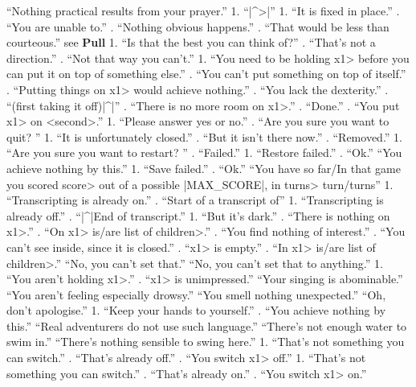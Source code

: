 {{{   ``Nothing practical results from your prayer.''
 1. ``|^>|''
  1. ``It is fixed in place.''
. ``You are unable to.''
. ``Nothing obvious happens.''
. ``That would be less than courteous.''
 see {\bf Pull}
 1. ``Is that the best you can think of?''
. ``That's not a direction.''
. ``Not that way you can't.''
  1. ``You need to be holding \<x1> before you
can put it on top of something else.''
. ``You can't put something on top of itself.''
. ``Putting things on \<x1> would achieve nothing.''
. ``You lack the dexterity.''
. ``(first taking it off)|^|''
. ``There is no more room on \<x1>.''
. ``Done.''
. ``You put \<x1> on <second>.''
   1. ``Please answer yes or no.''
. ``Are you sure you want to quit? '' 
  1. ``It is unfortunately closed.''
. ``But it isn't there now.''
. ``Removed.''
 1. ``Are you sure you want to restart? ''
. ``Failed.''
 1. ``Restore failed.''
. ``Ok.''
   ``You achieve nothing by this.''
   1. ``Save failed.''
. ``Ok.''
  ``You have so far/In that game you scored \<score> out of
a possible |MAX_SCORE|, in \<turns> turn/turns''
 1. ``Transcripting is already on.''
. ``Start of a transcript of''
 1. ``Transcripting is already off.''
. ``|^|End of transcript.''
  1. ``But it's dark.''
. ``There is nothing on \<x1>.''
. ``On \<x1> is/are \<list of children>.''
. ``You find nothing of interest.''
. ``You can't see inside, since it is closed.''
. ``\<x1> is empty.''
. ``In \<x1> is/are \<list of children>.''
   ``No, you can't set that.''
  ``No, you can't set that to anything.''
   1. ``You aren't holding \<x1>.''
. ``\<x1> is unimpressed.''
   ``Your singing is abominable.''
  ``You aren't feeling especially drowsy.''
  ``You smell nothing unexpected.''
  ``Oh, don't apologise.''
 1. ``Keep your hands to yourself.''
. ``You achieve nothing by this.''
  ``Real adventurers do not use such language.''
   ``There's not enough water to swim in.''
  ``There's nothing sensible to swing here.''
 1. ``That's not something you can switch.''
. ``That's already off.''
. ``You switch \<x1> off.''
 1. ``That's not something you can switch.''
. ``That's already on.''
. ``You switch \<x1> on.''
}}}
